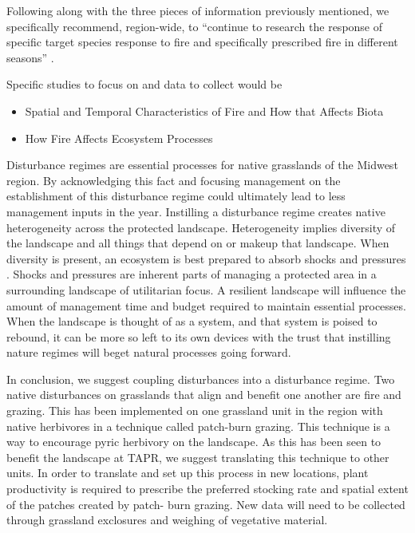 Following along with the three pieces of information previously mentioned, we specifically recommend, region-wide, to ``continue to research the response of specific target species response to fire and specifically prescribed fire in different seasons'' \citep{driscoll2010}.

 Specific studies to focus on and data to collect would be

\begin{itemize}
\item  Spatial and Temporal Characteristics of Fire and How that Affects Biota
\item  How Fire Affects Ecosystem Processes
\end{itemize}

Disturbance regimes are essential processes for native grasslands of the Midwest region. 
By acknowledging this fact and focusing management on the establishment of this disturbance regime could ultimately lead to less management inputs in the year. 
Instilling a disturbance regime creates native heterogeneity across the protected landscape.
Heterogeneity implies diversity of the landscape and all things that depend on or makeup that landscape. 
When diversity is present, an ecosystem is best prepared to absorb shocks and pressures \citep{walker2012}. 
Shocks and pressures are inherent parts of managing a protected area in a surrounding landscape of utilitarian focus. 
A resilient landscape will influence the amount of management time and budget required to maintain essential processes. 
When the landscape is thought of as a system, and that system is poised to rebound, it can be more so left to its own devices with the trust that instilling nature regimes will beget natural processes going forward.

In conclusion, we suggest coupling disturbances into a disturbance regime. 
Two native disturbances on grasslands that align and benefit one another are fire and grazing. 
This has been implemented on one grassland unit in the region with native herbivores in a technique called patch-burn grazing. 
This technique is a way to encourage pyric herbivory on the landscape. 
As this has been seen to benefit the landscape at TAPR, we suggest translating this technique to other units. 
In order to translate and set up this process in new locations, plant productivity is required to prescribe the preferred stocking rate and spatial extent of the patches created by patch- burn grazing. 
New data will need to be collected through grassland exclosures and weighing of vegetative material.